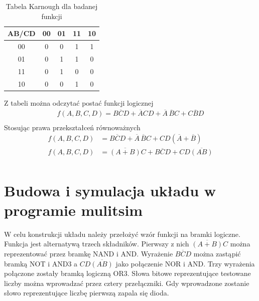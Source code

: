 \documentclass[12pt,a4paper,openright]{mwrep}
\begin{document}
\begin{table}[h!]
    \centering
    \begin{tabular}{|c|cccc|}
        \hline
        AB/CD & 00 & 01 & 11 & 10 \\
        \hline
        00 & 0 & 0 & 1 & 1 \\
        01 & 0 & 1 & 1 & 0 \\
        11 & 0 & 1 & 0 & 0 \\
        10 & 0 & 0 & 1 & 0 \\
        \hline
    \end{tabular}
    \caption{Tabela Karnough dla badanej funkcji}
\end{table}
Z tabeli można odczytać postać funkcji logicznej
\begin{align*}
    f(A,B,C,D) = B\overline{C}D  + \overline{A}CD 
    + \overline{A}\,\overline{B}C + C\overline{B}D   \\ 
\end{align*}
Stosując prawa przekształceń równoważnych
\begin{align*}
    f(A,B,C,D) &= B\overline{C}D 
    + \overline{A}\,\overline{B}C + CD(\overline{A} + \overline{B})   \\ 
    f(A,B,C,D) &= \overline{(A + B)}C + B\overline{C}D 
    +  CD\overline{(AB)}\\
\end{align*}
\section{Budowa i symulacja układu w programie mulitsim}
W celu konstrukcji układu należy przełożyć wzór funkcji na bramki logiczne.
Funkcja jest alternatywą trzech składników.
Pierwszy z nich $ \overline{(A+B)} C $ można reprezentować
przez bramkę NAND i AND. Wyrażenie $ B\overline{C}D $ można zastąpić bramką NOT i AND3
a $ CD\overline{(AB)} $ jako połączenie NOR i AND.
Trzy wyrażenia połączone zostały bramką logiczną OR3. 
Słowa bitowe reprezentujące testowane liczby można wprowadzać przez cztery przełączniki.
Gdy wprowadzone zostanie słowo reprezentujące liczbę pierwszą zapala się dioda.
\end{document}
